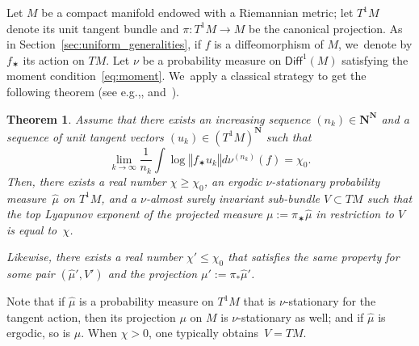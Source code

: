 \documentclass[11pt]{article}
\newcommand{\eg}{e.g.,\xspace}
\newcommand{\norm}[1]{{\left\Vert#1\right\Vert}}
\def\N{\mathbf{N}}
\newcommand\Diff{{\mathsf{Diff}}}
\theoremstyle{plain}
\newtheorem{thm}{Theorem}[section]
\theoremstyle{definition}
\numberwithin{equation}{section}
\begin{document}
Let $M$ be a compact manifold endowed with a Riemannian metric; let $T^1M$ denote its unit tangent bundle
and $\pi\colon T^1M\to M$ be the canonical projection. As in Section~\ref{sec:uniform_generalities},
if $f$ is a diffeomorphism of $M$, we~denote by $f_\varstar $ its action on $TM$.
Let $\nu$ be a probability measure on $\Diff^1(M)$
satisfying the moment condition~\eqref{eq:moment}. We~apply a classical strategy to get the
following theorem (see \eg \cite[Prop.\,3.17]{chung}, and~\cite[Lem.\,3.3]{hurtado:burnside}).

\begin{thm}\label{thm:limit_measure_top_lyapunov}
Assume that there exists an increasing sequence $(n_k)\in \N^\N$ and a
sequence of unit tangent vectors $( u_k)\in (T^1M)^\N$
such that
\begin{equation*}\label{eq:exponential_dilatation}
\lim_{k\to\infty} \frac{1}{n_k} \int \log \norm{f_\varstar u_k} d\nu^{(n_k)}(f) = \chi_0.
\end{equation*}
Then, there exists a real number $\chi\geq \chi_0$, an ergodic $\nu$-stationary probability measure~$\hat{\mu}$
on $T^1M$, and a $\nu$-almost surely invariant sub-bundle $V\subset TM$ such that the top Lyapunov exponent of the projected measure $\mu:=\pi_\varstar \hat{\mu}$ in restriction to $V$ is equal to~$\chi$.

Likewise, there exists
a real number $\chi' \leq \chi_0$ that satisfies the same property for
some pair $(\hat{\mu}', V')$ and the projection $\mu':= \pi_*\hat{\mu}'$.
\end{thm}

Note that if $\hat\mu$ is a probability measure on $T^1M$ that is
$\nu$-stationary for the tangent action, then its projection $\mu $ on $M$ is $\nu$-stationary as well; and if $\hat\mu$ is ergodic, so is $\mu$.
When $\chi >0$, one typically obtains~$V=TM$.
\end{document}
